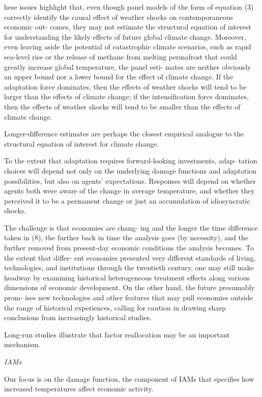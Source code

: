\documentclass[
]{book}
\begin{document}
hese issues highlight that, even though
panel models of the form of equation (3)
correctly identify the causal effect of weather
shocks on contemporaneous economic out-
comes, they may not estimate the structural
equation of interest for understanding the
likely effects of future global climate change.
Moreover, even leaving aside the potential
of catastrophic climate scenarios, such as
rapid sea-level rise or the release of methane
from melting permafrost that could greatly
increase global temperature, the panel esti-
mates are neither obviously an upper bound
nor a lower bound for the effect of climate
change. If the adaptation force dominates,
then the effects of weather shocks will tend to
be larger than the effects of climate change;
if the intensification force dominates, then
the effects of weather shocks will tend to be
smaller than the effects of climate change.

Longer-difference estimates are
perhaps the closest empirical analogue to
the structural equation of interest for climate change.

To the extent that adaptation
requires forward-looking investments, adap-
tation choices will depend not only on the
underlying damage functions and adaptation
possibilities, but also on agents' expectations.
Responses will depend on whether agents
both were aware of the change in average
temperature, and whether they perceived it
to be a permanent change or just an accumulation of idiosyncratic shocks.

The challenge is that economies are chang-
ing and the longer the time difference taken
in (8), the further back in time the analysis
goes (by necessity), and the further removed
from present-day economic conditions the
analysis becomes. To the extent that differ-
ent economies presented very different standards of living, technologies, and institutions
through the twentieth century, one may still
make headway by examining historical heterogeneous treatment effects along various
dimensions of economic development. On
the other hand, the future presumably prom-
ises new technologies and other features that
may pull economies outside the range of
historical experiences, calling for caution in
drawing sharp conclusions from increasingly
historical studies.

Long-run studies illustrate
that factor reallocation may be an important mechanism.

\emph{IAMs}

Our focus is on the damage function,
the component of IAMs that specifies how
increased temperatures affect economic
activity.
\end{document}
